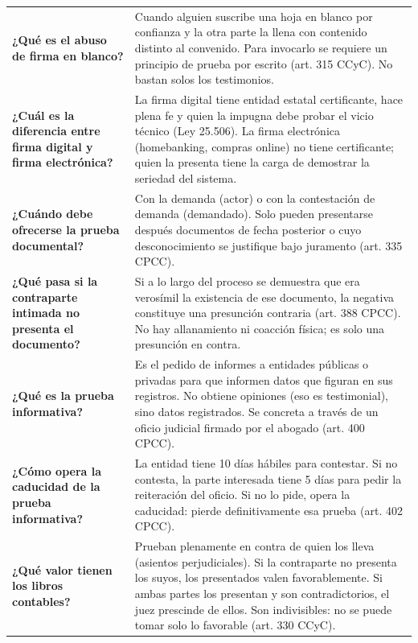 \documentclass[12pt,oneside]{book}
\begin{document}
\begin{longtable}{
    >{\raggedright\arraybackslash}p{}
    >{\raggedright\arraybackslash}p{}
}
\textbf{¿Qué es el abuso de firma en blanco?} &
Cuando alguien suscribe una hoja en blanco por confianza y la otra parte la llena con contenido distinto al convenido. Para invocarlo se requiere un principio de prueba por escrito (art. 315 CCyC). No bastan solos los testimonios. \\

\textbf{¿Cuál es la diferencia entre firma digital y firma electrónica?} &
La firma digital tiene entidad estatal certificante, hace plena fe y quien la impugna debe probar el vicio técnico (Ley 25.506). La firma electrónica (homebanking, compras online) no tiene certificante; quien la presenta tiene la carga de demostrar la seriedad del sistema. \\

\textbf{¿Cuándo debe ofrecerse la prueba documental?} &
Con la demanda (actor) o con la contestación de demanda (demandado). Solo pueden presentarse después documentos de fecha posterior o cuyo desconocimiento se justifique bajo juramento (art. 335 CPCC). \\

\textbf{¿Qué pasa si la contraparte intimada no presenta el documento?} &
Si a lo largo del proceso se demuestra que era verosímil la existencia de ese documento, la negativa constituye una presunción contraria (art. 388 CPCC). No hay allanamiento ni coacción física; es solo una presunción en contra. \\

\textbf{¿Qué es la prueba informativa?} &
Es el pedido de informes a entidades públicas o privadas para que informen datos que figuran en sus registros. No obtiene opiniones (eso es testimonial), sino datos registrados. Se concreta a través de un oficio judicial firmado por el abogado (art. 400 CPCC). \\

\textbf{¿Cómo opera la caducidad de la prueba informativa?} &
La entidad tiene 10 días hábiles para contestar. Si no contesta, la parte interesada tiene 5 días para pedir la reiteración del oficio. Si no lo pide, opera la caducidad: pierde definitivamente esa prueba (art. 402 CPCC). \\

\textbf{¿Qué valor tienen los libros contables?} &
Prueban plenamente en contra de quien los lleva (asientos perjudiciales). Si la contraparte no presenta los suyos, los presentados valen favorablemente. Si ambas partes los presentan y son contradictorios, el juez prescinde de ellos. Son indivisibles: no se puede tomar solo lo favorable (art. 330 CCyC). \\


\end{longtable}
\end{document}

